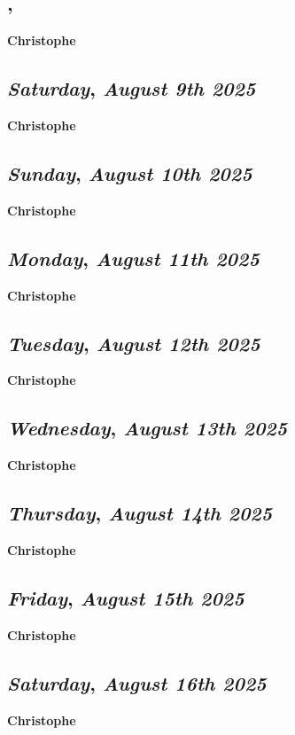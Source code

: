 \subsection*{\weekday, \day}
\textbf {Christophe}

\def\day{\textit{August 9th 2025}}
\def\weekday{\textit{Saturday}}
\subsection*{\weekday, \day}
\textbf {Christophe}

\def\day{\textit{August 10th 2025}}
\def\weekday{\textit{Sunday}}
\subsection*{\weekday, \day}
\textbf {Christophe}

\def\day{\textit{August 11th 2025}}
\def\weekday{\textit{Monday}}
\subsection*{\weekday, \day}
\textbf {Christophe}

\def\day{\textit{August 12th 2025}}
\def\weekday{\textit{Tuesday}}
\subsection*{\weekday, \day}
\textbf {Christophe}

\def\day{\textit{August 13th 2025}}
\def\weekday{\textit{Wednesday}}
\subsection*{\weekday, \day}
\textbf {Christophe}

\def\day{\textit{August 14th 2025}}
\def\weekday{\textit{Thursday}}
\subsection*{\weekday, \day}
\textbf {Christophe}

\def\day{\textit{August 15th 2025}}
\def\weekday{\textit{Friday}}
\subsection*{\weekday, \day}
\textbf {Christophe}

\def\day{\textit{August 16th 2025}}
\def\weekday{\textit{Saturday}}
\subsection*{\weekday, \day}
\textbf {Christophe}


